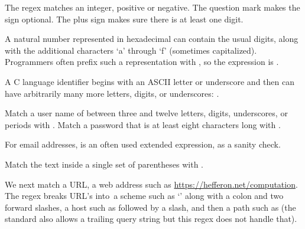 \documentclass[9pt,t,serif,professionalfont,xcolor={table,dvipsnames},noamsthm]{beamer}
\begin{document}
\begin{frame}
\begin{example}
The regex  matches
an integer, positive or negative.
The question mark makes the sign optional.
The plus sign makes sure there is at least one digit.
\end{example}

\begin{example}
A natural number represented in hexadecimal can contain the usual digits,
along with the additional characters `a' through `f' (sometimes capitalized). 
Programmers often prefix such a representation
with , so the expression is .
\end{example}

\begin{example}
A C language identifier begins with an ASCII
letter or underscore and then can have arbitrarily many more
letters, digits, or underscores:
.
\end{example}

\begin{example}
Match a user name of between three and twelve letters, digits, underscores,
or periods with .
Match a password that is at least eight characters long with .
\end{example}

\pause
\begin{example}
For email addresses,  is
an often used extended expression, as a sanity check.
\end{example}

\begin{example}
Match the text inside a single set of parentheses with 
\re{\textbackslash ([\textasciicircum ()]*\textbackslash )}.
\end{example}

\begin{example}
We next match a URL, a web address such as
\url{https://hefferon.net/computation}.
The regex breaks URL's into~a
scheme such as `' along with
a colon and two forward slashes,
a host such as  followed by a slash, and then
a path such as 
(the standard also allows a trailing query string 
but this regex does not handle that).
\begin{center}%
\end{center}
\end{example}
\end{frame}
\end{document}
